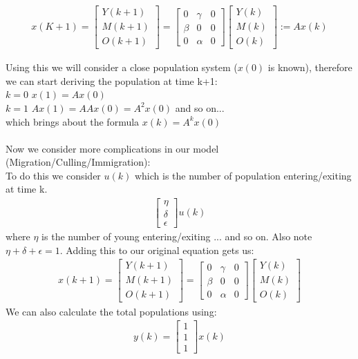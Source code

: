 \documentclass[a4paper,11pt]{article}
\begin{document}
\begin{gather}
x(K+1)=
 \begin{bmatrix} Y(k+1) \\ M(k+1 )\\ O(k+1)\end{bmatrix}
 =
  \begin{bmatrix}
	0 & \gamma & 0 \\
	\beta & 0 & 0 \\
	0 & \alpha & 0 
   \end{bmatrix}
    \begin{bmatrix} Y(k) \\ M(k)\\ O(k)\end{bmatrix}
    := A x(k)
\end{gather}

Using this we will consider a close population system ($x(0)$ is known), therefore we can start deriving the population at time k+1:\\
$k=0$ $x(1)=Ax(0)$\\
$k=1$ $Ax(1)=AAx(0)=A^2x(0)$ and so on...\\
which brings about the formula $x(k)=A^kx(0)$\\\\
Now we consider more complications in our model (Migration/Culling/Immigration):\\
To do this we consider $u(k)$ which is the number of population entering/exiting at time k.\\
\begin{gather}
 \begin{bmatrix} \eta \\ \delta \\ \epsilon\end{bmatrix}u(k)
\end{gather}
where $\eta$ is the number of young entering/exiting ... and so on. Also note $\eta+\delta+\epsilon = 1$. Adding this to our original equation gets us:
\begin{gather}
x(k+1)=
 \begin{bmatrix} Y(k+1) \\ M(k+1 )\\ O(k+1)\end{bmatrix}
 =
  \begin{bmatrix}
	0 & \gamma & 0 \\
	\beta & 0 & 0 \\
	0 & \alpha & 0 
   \end{bmatrix}
    \begin{bmatrix} Y(k) \\ M(k)\\ O(k)\end{bmatrix}
\end{gather}
We can also calculate the total populations using:
\begin{gather}
y(k)=
 \begin{bmatrix} 1\\ 1\\ 1\end{bmatrix}
	x(k)
\end{gather}
\end{document}
